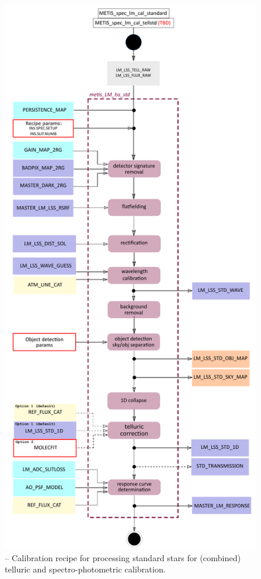 \begin{figure}[ht]
  \centering
  \includegraphics[width=0.4\textheight]{figures/metis_lm_lss_std_v0.82.pdf}
  \caption[Recipe: ]{ --
    Calibration recipe for processing standard stars for (combined) telluric and  spectro-photometric calibration.}
  \label{Fig:rec_lm_lss_flux1}
\end{figure}
